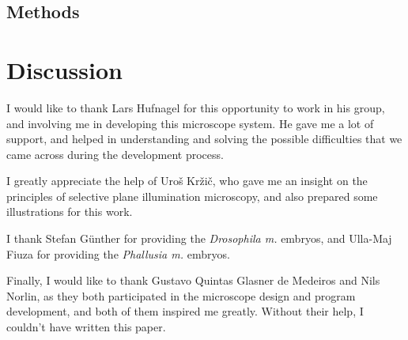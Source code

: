 \documentclass{diploma_style}
\begin{document}
\section{Methods}


\chapter{Discussion}

\newpage
\cleardoublepage
{}
\begin{acknowledgements}

I would like to thank Lars Hufnagel for this opportunity to work in his group, and involving me in developing this microscope system. He gave me a lot of support, and helped in understanding and solving the possible difficulties that we came across during the development process.

I greatly appreciate the help of Uroš Kržič, who gave me an insight on the principles of selective plane illumination microscopy, and also prepared some illustrations for this work.

I thank Stefan Günther for providing the \textit{Drosophila m.} embryos, and \mbox{Ulla-Maj} Fiuza for providing the \textit{Phallusia m.} embryos.

Finally, I would like to thank Gustavo Quintas Glasner de Medeiros and Nils Norlin, as they both participated in the microscope design and program development, and both of them inspired me greatly. Without their help, I couldn't have written this paper.

\end{acknowledgements}

\cleardoublepage
{}
{}

{ \footnotesize }
\end{document}
